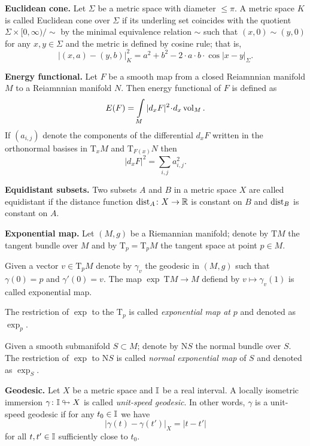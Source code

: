 \begin{description}
\item{\bf Euclidean cone.}\label{Euclidean cone} 
Let $\Sigma$ be a metric space with diameter $\le \pi$. 
A metric space $K$ is called Euclidean cone over $\Sigma$
if its underling set 
coincides with the quotient 
$\Sigma\times [0,\infty)/{\sim}$
by the minimal equivalence relation $\sim$ such that $(x,0)\sim(y,0)$ for any $x,y\in \Sigma$
and the metric is defined by cosine rule;
that is,
$$|(x,a)-(y,b)|^2_K=a^2+b^2-2\cdot a\cdot b\cdot\!\cos|x-y|_\Sigma.$$

\item{\bf Energy functional.}\label{Energy functional} Let $F$ be a smooth map from a closed Reiamnnian manifold $M$ to a Reiamnnian manifold $N$.
Then energy functional of $F$ is defined as
\[E(F)=\int\limits_M |d_xF|^2\cdot d_x\vol_M.\]
If $(a_{i,j})$ denote the components 
of the differential $d_xF$ 
written in the orthonormal basises in $\mathrm{T}_xM$ and $\mathrm{T}_{F(x)}N$
then 
\[|d_xF|^2=\sum_{i,j}a_{i,j}^2.\]

\item{\bf Equidistant subsets.}\label{Equidistant subsets} 
Two subsets $A$ and $B$ in a metric space $X$ are called equidistant if the distance function $\operatorname{\rm dist}_A\colon X\to\mathbb{R}$ is constant on $B$ and $\operatorname{\rm dist}_B$ is constant on $A$.

\item{\bf Exponential map.}\label{Exponential map} 
Let $(M,g)$ be a Riemannian manifold;
denote by $\mathrm{T} M$ the tangent bundle over $M$ and by $\mathrm{T}_p=\mathrm{T}_pM$ the tangent space at point $p\in M$.

Given a vector $v\in\mathrm{T}_pM$ denote by $\gamma_v$ the geodesic in $(M,g)$
such that $\gamma(0)=p$ and $\gamma'(0)=v$.
The map $\exp\:\mathrm{T} M\to M$ defiend by $v\mapsto \gamma_v(1)$ is called exponential map.

The restriction of $\exp$ to the $\mathrm{T}_p$ is called \emph{exponential map at} $p$ and denoted as $\exp_p$.

Given a smooth submanifold $S\subset M$;
denote by $\mathrm{N} S$ the normal bundle over $S$.
The restriction of $\exp$ to $\mathrm{N} S$ is called \emph{normal exponential map} of $S$ and denoted as $\exp_S$. 

\item{\bf Geodesic.}\label{Geodesic}  
Let $X$ be a metric space and $\mathbb{I}$ be a real interval.
A locally isometric immersion $\gamma\colon\mathbb{I}\looparrowright X$ is called \emph{unit-speed geodesic}.
In other words, $\gamma$ is a unit-speed geodesic
if for any $t_0\in\mathbb{I}$ we have 
$$|\gamma(t)-\gamma(t')|_X=|t-t'|$$ 
for all $t,t'\in\mathbb{I}$ sufficiently close to $t_0$.


\end{description}
